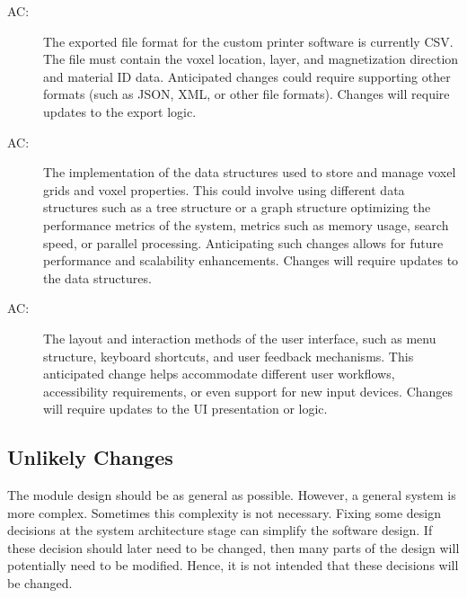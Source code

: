 \documentclass[12pt, titlepage]{article}
\newcounter{acnum}
\newcommand{\actheacnum}{AC\theacnum}
\begin{document}
\begin{description}
\item[ \actheacnum\label{acExport}:] The exported file format for the custom printer software is currently CSV. The file must contain the voxel location, layer, and magnetization direction and material ID data. Anticipated changes could require supporting other formats (such as JSON, XML, or other file formats). Changes will require updates to the export logic.

\item[ \actheacnum\label{acDataStructure}:] The implementation of the data structures used to store and manage voxel grids and voxel properties. This could involve using different data structures such as a tree structure or a graph structure optimizing the performance metrics of the system, metrics such as memory usage, search speed, or parallel processing. Anticipating such changes allows for future performance and scalability enhancements. Changes will require updates to the data structures.

\item[ \actheacnum\label{acUI}:] The layout and interaction methods of the user interface, such as menu structure, keyboard shortcuts, and user feedback mechanisms. This anticipated change helps accommodate different user workflows, accessibility requirements, or even support for new input devices. Changes will require updates to the UI presentation or logic.

\end{description}

\subsection{Unlikely Changes}\label{SecUchange}

The module design should be as general as possible. However, a general system is
more complex. Sometimes this complexity is not necessary. Fixing some design
decisions at the system architecture stage can simplify the software design. If
these decision should later need to be changed, then many parts of the design
will potentially need to be modified. Hence, it is not intended that these
decisions will be changed.
\end{document}
